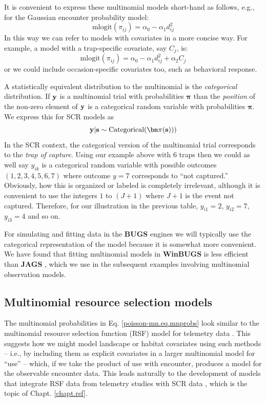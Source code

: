 It is convenient to express these multinomial models short-hand as
follows, e.g., for the Gaussian encounter probability model:
\[
\mbox{mlogit}( \pi_{ij} ) = \alpha_{0} - \alpha_{1} d_{ij}^{2}
\]
In this way we can refer to models with covariates in a more concise
way. For example, a model with a trap-specific covariate, say $C_{j}$, is:
\[
\mbox{mlogit}( \pi_{ij} ) = \alpha_{0} - \alpha_{1} d_{ij}^{2} + \alpha_{2} C_{j}
\]
or we could include occasion-specific covariates too, such as
behavioral response.

A statistically equivalent distribution to the multinomial is the {\it
  categorical} distribution.  If ${\bf y}$ is a multinomial trial with
probabilities ${\bm \pi}$ than the {\it position} of the non-zero
element of ${\bf y}$ is a categorical random variable with
probabilities ${\bm \pi}$.  We express this for SCR models as
\[
{\bf y}|{\bf s} \sim \mbox{Categorical}( {\bm \pi}({\bf s})) )
\]
In the SCR context, the categorical version of the multinomial trial
corresponds to the {\it trap of capture}.  Using our example above
with 6 traps then we could as well say $y_{ik}$ is a categorical
random variable with possible outcomes $(1,2,3,4,5,6,7)$ where outcome
$y=7$ corresponds to ``not captured.'' Obviously, how this is
organized or labeled is completely irrelevant, although it is
convenient to use the integers $1$ to $(J+1)$ where $J+1$ is the event
not captured.  Therefore, for our illustration in the previous table,
$y_{i1} = 2$, $y_{i2} = 7$, $y_{i3} = 4$ and so on.

For simulating and fitting data in the {\bf BUGS} engines we will
typically use the categorical representation of the model because it
is somewhat more convenient.  We have found that fitting multinomial
models in {\bf WinBUGS} is less efficient than {\bf JAGS}
\citep{royle_converse:2013}, which we use in the subsequent examples
involving multinomial observation models.


\subsection{Multinomial  resource selection models}

The multinomial probabilities in Eq. \ref{poisson-mn.eq.mnprobs}
look similar to the
multinomial resource selection function (RSF) model for telemetry data
\citep{manly_etal:2002, lele_keim:2006}.  This suggests how we might
model landscape or habitat covariates using such methods -- i.e., by
including them as explicit covariates in a larger multinomial model
for ``use'' -- which, if we take the product of use with encounter,
produces a model for the observable encounter data. This
leads naturally to the development of models that integrate RSF data
from telemetry studies with SCR data
\citep{royle_etal:2012mee},
which is the topic of  Chapt. \ref{chapt.rsf}.



